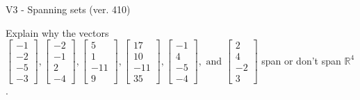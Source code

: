 \begin{exercise}
  \begin{exerciseTitle}V3 - Spanning sets (ver. 410)\end{exerciseTitle}
  \begin{exerciseStatement}
    Explain why the vectors \(\left[\begin{array}{r}
-1 \\
-2 \\
-5 \\
-3
\end{array}\right] , \left[\begin{array}{r}
-2 \\
-1 \\
2 \\
-4
\end{array}\right] , \left[\begin{array}{r}
5 \\
1 \\
-11 \\
9
\end{array}\right] , \left[\begin{array}{r}
17 \\
10 \\
-11 \\
35
\end{array}\right] , \left[\begin{array}{r}
-1 \\
4 \\
-5 \\
-4
\end{array}\right] , \text{ and } \left[\begin{array}{r}
2 \\
4 \\
-2 \\
3
\end{array}\right]\) span or don't span \(\mathbb{R}^4\). 
	



\end{exerciseStatement}
\end{exercise}
